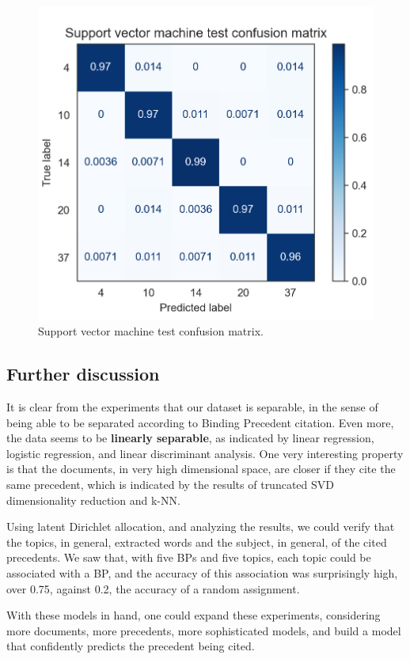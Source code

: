 \documentclass[twocolumn]{article}
\begin{document}
                  \begin{figure}[H]
                        \includegraphics[width=\linewidth]{svm.png}
                        \caption{Support vector machine test confusion matrix.}
                        \label{fig:svm}
                  \end{figure}

            \subsection{Further discussion}

                  It is clear from the experiments that our dataset is separable, in the sense of being able to be separated according to Binding Precedent citation. Even more, the data seems to be \textbf{linearly separable}, as indicated by linear regression, logistic regression, and linear discriminant analysis. One very interesting property is that the documents, in very high dimensional space, are closer if they cite the same precedent, which is indicated by the results of truncated SVD dimensionality reduction and k-NN.

                  Using latent Dirichlet allocation, and analyzing the results, we could verify that the topics, in general, extracted words and the subject, in general, of the cited precedents. We saw that, with five BPs and five topics, each topic could be associated with a BP, and the accuracy of this association was surprisingly high, over 0.75, against 0.2, the accuracy of a random assignment.

                  With these models in hand, one could expand these experiments, considering more documents, more precedents, more sophisticated models, and build a model that confidently predicts the precedent being cited.

      
      
\end{document}
